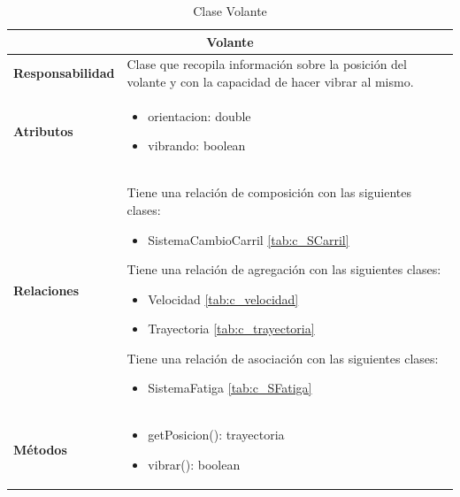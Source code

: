 \begin{table}[H]
\begin{center}
\begin{tabular}{p{} p{11cm}}
\multicolumn{2}{c}{\textbf{Volante} } \\ \hline \hline
\textbf{Responsabilidad} &  Clase que recopila información sobre la posición del volante y con la capacidad de hacer vibrar al mismo.  \\ \hline
\textbf{Atributos} & \begin{itemize}
                      \item orientacion: double
                      \item vibrando: boolean
                    \end{itemize}
                      \\ \hline
\textbf{Relaciones} & \par Tiene una relación de composición con las siguientes clases:
                      \begin{itemize}
                        \item SistemaCambioCarril \ref{tab:c_SCarril}
                      \end{itemize}

                      \par Tiene una relación de agregación con las siguientes clases:
                      \begin{itemize}
                        \item Velocidad \ref{tab:c_velocidad}
                        \item Trayectoria \ref{tab:c_trayectoria}
                      \end{itemize}

                      \par Tiene una relación de asociación con las siguientes clases:
                      \begin{itemize}
                        \item SistemaFatiga \ref{tab:c_SFatiga}
                      \end{itemize}

                      \\ \hline



\textbf{Métodos} &  \begin{itemize}
                      \item getPosicion(): trayectoria
                      \item vibrar(): boolean
                    \end{itemize}\\ \hline
\end{tabular}
\caption{Clase Volante}
\label{tab:c_Volante}
\end{center}
\end{table}









